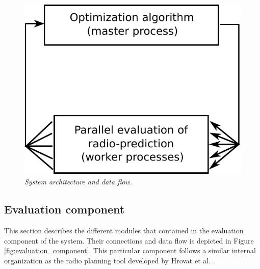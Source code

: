 \begin{figure}
\centering

\includegraphics[width=1\columnwidth]{05-framework_parameter_tuning/img/architecture}

\caption{\textit{System architecture and data flow.\label{fig:system_architecture}}}
\end{figure}



\subsection{Evaluation component}

This section describes the different modules that contained in the
evaluation component of the system. Their connections and data flow
is depicted in Figure \ref{fig:evaluation_component}. This particular
component follows a similar internal organization as the radio planning
tool developed by Hrovat et al. \cite{Ozimek_Open.source.radio.coverage.prediction:2010}.

